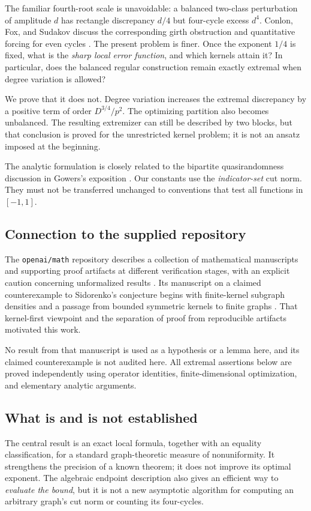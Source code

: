 \documentclass[11pt]{article}
\theoremstyle{definition}
\newcommand{\1}{\mathbf 1}
\begin{document}
The familiar fourth-root scale is unavoidable: a balanced two-class perturbation of amplitude $d$ has rectangle discrepancy $d/4$ but four-cycle excess $d^4$. Conlon, Fox, and Sudakov discuss the corresponding girth obstruction and quantitative forcing for even cycles \cite[Section~4]{CFS2018}. The present problem is finer. Once the exponent $1/4$ is fixed, what is the \emph{sharp local error function}, and which kernels attain it? In particular, does the balanced regular construction remain exactly extremal when degree variation is allowed?

We prove that it does not. Degree variation increases the extremal discrepancy by a positive term of order $D^{3/4}/p^2$. The optimizing partition also becomes unbalanced. The resulting extremizer can still be described by two blocks, but that conclusion is proved for the unrestricted kernel problem; it is not an ansatz imposed at the beginning.

The analytic formulation is closely related to the bipartite quasirandomness discussion in Gowers's exposition \cite{Gowers2018}. Our constants use the \emph{indicator-set} cut norm. They must not be transferred unchanged to conventions that test all functions in $[-1,1]$.

\subsection{Connection to the supplied repository}
The \texttt{openai/math} repository describes a collection of mathematical manuscripts and supporting proof artifacts at different verification stages, with an explicit caution concerning unformalized results \cite{OpenAIMath}. Its manuscript on a claimed counterexample to Sidorenko's conjecture begins with finite-kernel subgraph densities and a passage from bounded symmetric kernels to finite graphs \cite{RepoKernel}. That kernel-first viewpoint and the separation of proof from reproducible artifacts motivated this work.

No result from that manuscript is used as a hypothesis or a lemma here, and its claimed counterexample is not audited here. All extremal assertions below are proved independently using operator identities, finite-dimensional optimization, and elementary analytic arguments.

\subsection{What is and is not established}
The central result is an exact local formula, together with an equality classification, for a standard graph-theoretic measure of nonuniformity. It strengthens the precision of a known theorem; it does not improve its optimal exponent. The algebraic endpoint description also gives an efficient way to \emph{evaluate the bound}, but it is not a new asymptotic algorithm for computing an arbitrary graph's cut norm or counting its four-cycles.
\end{document}
